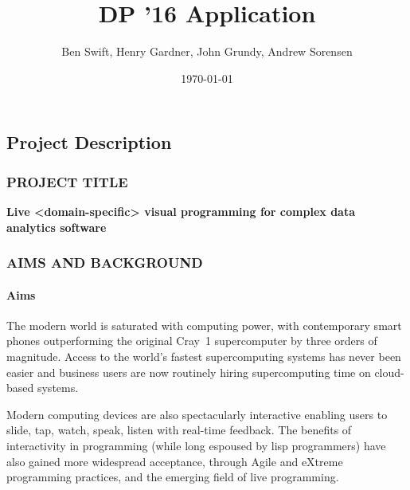 \documentclass[a4paper]{scrartcl}
\author{Ben Swift, Henry Gardner, John Grundy, Andrew Sorensen}
\date{\today}
\title{DP '16 Application}
\begin{document}
\renewcommand{\thesection}{\Alph{section}}

\setcounter{section}{3} %
\subsection{Project Description}
\label{sec:project-description}

\subsubsection*{PROJECT TITLE}

\textbf{Live <domain-specific> visual programming for complex data
  analytics software}

\subsubsection*{AIMS AND BACKGROUND}

\paragraph{Aims}

The modern world is saturated with computing power, with contemporary
smart phones outperforming the original Cray~1 supercomputer by three
orders of magnitude. Access to the world's fastest supercomputing
systems has never been easier and business users are now routinely
hiring supercomputing time on cloud-based systems.

Modern computing devices are also spectacularly interactive enabling
users to slide, tap, watch, speak, listen with real-time feedback. The
benefits of interactivity in programming (while long espoused by lisp
programmers) have also gained more widespread acceptance, through
Agile\parencite{Fowler2001} and eXtreme\parencite{Beck1999}
programming practices, and the emerging field of live
programming\parencite{Swift2013b}.
\end{document}
